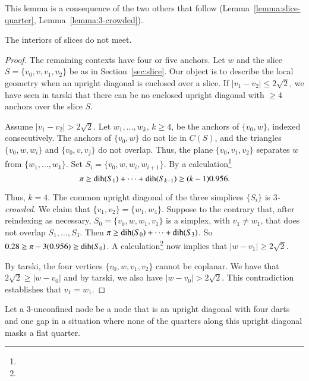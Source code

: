 This lemma is a consequence of the two others that follow
(Lemma~\ref{lemma:slice-quarter}, Lemma~\ref{lemma:3-crowded}).

\begin{lemma}
The interiors of slices do not meet.
\end{lemma}

\begin{proof}
The remaining contexts have four or  five anchors. Let $w$ and the
slice $S=\{v_0,v,v_1,v_2\}$ be as in Section~\ref{sec:slice}.
Our object is to describe the local geometry when an upright
diagonal is enclosed over a slice. If $|v_1-v_2|\le
2\sqrt{2}$, we have seen in tarski that
there can be no enclosed upright diagonal with $\ge 4$ anchors
over the slice $S$.

Assume  $|v_1-v_2|>2\sqrt{2}$. Let $w_1,\ldots,w_k$, $k\ge4$, be the
anchors of $\{v_0,w\}$, indexed consecutively. The anchors of $\{v_0,w\}$ do not
lie in $C(S)$, and the triangles $\{v_0,w,w_i\}$ and $\{v_0,v,v_j\}$ do not
overlap. Thus, the plane $\{v_0,v_1,v_2\}$ separates $w$ from
$\{w_1,\ldots,w_k\}$. Set $S_i=\{v_0,w,w_i,w_{i+1}\}$.
By a calculation\footnote{} %
    $$\pi\ge \operatorname{dih}(S_1)+\cdots+\operatorname{dih}(S_{k-1})\ge (k-1)0.956.$$

Thus, $k=4$. The common upright diagonal  of the three simplices
$\{S_i\}$ is {\it $3$-crowded}.  We claim that
$\{v_1,v_2\}=\{w_1,w_4\}$. Suppose to the contrary that, after
reindexing as necessary, $S_0=\{v_0,w,w_1,v_1\}$ is a simplex, with
$v_1\ne w_1$, that does not overlap $S_1,\ldots,S_3$. Then $\pi\ge
\operatorname{dih}(S_0)+\cdots+\operatorname{dih}(S_3)$. So
    $0.28\ge \pi-3(0.956)\ge \operatorname{dih}(S_0)$.
A calculation\footnote{} %
now implies that $|w-v_1|\ge 2\sqrt{2}$.

By tarski, the four vertices
$\{v_0,w,v_1,v_2\}$ cannot be coplanar.
We have that $2\sqrt{2}\ge|w-v_0|$ and by tarski,
we also have $|w-v_0|>2\sqrt2$.
This contradiction establishes that $v_1=w_1$.
\end{proof}


\begin{definition}[unconfined]
Let a $3$-unconfined node be a node that is an upright diagonal 
with four darts and one gap in a situation where none of
the quarters along this upright diagonal masks a flat quarter.
\end{definition}








